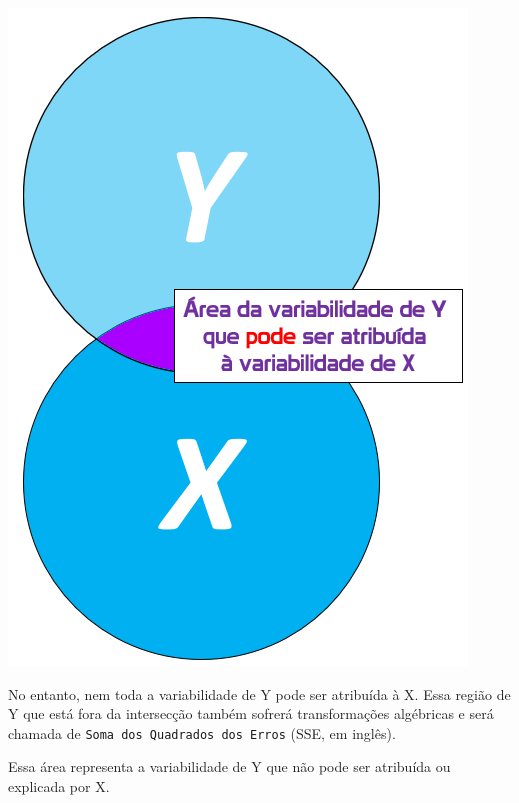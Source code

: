 \documentclass[
]{book}
\begin{document}
\includegraphics{./img/cap_reg_xy_SSR.png}

No entanto, nem toda a variabilidade de Y pode ser atribuída à X. Essa região de Y que está fora da intersecção também sofrerá transformações algébricas e será chamada de \texttt{Soma\ dos\ Quadrados\ dos\ Erros} (SSE, em inglês).

Essa área representa a variabilidade de Y que não pode ser atribuída ou explicada por X.
\end{document}
